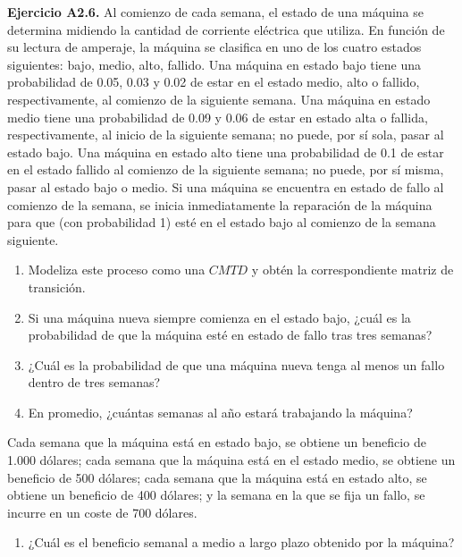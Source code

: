 \documentclass[
]{book}
\providecommand{\tightlist}{%
  \setlength{\itemsep}{0pt}\setlength{\parskip}{0pt}}
\theoremstyle{definition}
\theoremstyle{definition}
\theoremstyle{definition}
\theoremstyle{definition}
\theoremstyle{remark}
\begin{document}
\textbf{Ejercicio A2.6.} Al comienzo de cada semana, el estado de una máquina se determina midiendo la cantidad de corriente eléctrica que utiliza. En función de su lectura de amperaje, la máquina se clasifica en uno de los cuatro estados siguientes: bajo, medio, alto, fallido. Una máquina en estado bajo tiene una probabilidad de 0.05, 0.03 y 0.02 de estar en el estado medio, alto o fallido, respectivamente, al comienzo de la siguiente semana. Una máquina en estado medio tiene una probabilidad de 0.09 y 0.06 de estar en estado alta o fallida, respectivamente, al inicio de la siguiente semana; no puede, por sí sola, pasar al estado bajo. Una máquina en estado alto tiene una probabilidad de 0.1 de estar en el estado fallido al comienzo de la siguiente semana; no puede, por sí misma, pasar al estado bajo o medio. Si una máquina se encuentra en estado de fallo al comienzo de la semana, se inicia inmediatamente la reparación de la máquina para que (con probabilidad 1) esté en el estado bajo al comienzo de la semana siguiente.

\begin{enumerate}
\def\labelenumi{\arabic{enumi}.}
\tightlist
\item
  Modeliza este proceso como una \(CMTD\) y obtén la correspondiente matriz de transición.
\item
  Si una máquina nueva siempre comienza en el estado bajo, ¿cuál es la probabilidad de que la máquina esté en estado de fallo tras tres semanas?
\item
  ¿Cuál es la probabilidad de que una máquina nueva tenga al menos un fallo dentro de tres semanas?
\item
  En promedio, ¿cuántas semanas al año estará trabajando la máquina?
\end{enumerate}

Cada semana que la máquina está en estado bajo, se obtiene un beneficio de 1.000 dólares; cada semana que la máquina está en el estado medio, se obtiene un beneficio de 500 dólares; cada semana que la máquina está en estado alto, se obtiene un beneficio de 400 dólares; y la semana en la que se fija un fallo, se incurre en un coste de 700 dólares.

\begin{enumerate}
\def\labelenumi{\arabic{enumi}.}
\setcounter{enumi}{4}
\tightlist
\item
  ¿Cuál es el beneficio semanal a medio a largo plazo obtenido por la máquina?
\end{enumerate}
\end{document}
